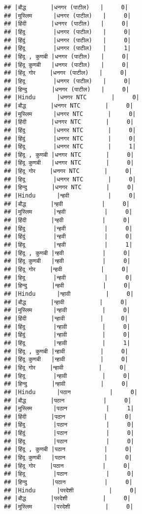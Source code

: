 \documentclass[
]{article}
\begin{document}
\begin{verbatim}
## |बौद्ध       |धनगर (पाटील)   |     0|
## |मुस्लिम      |धनगर (पाटील)   |     0|
## |हिंदी       |धनगर (पाटील)   |     0|
## |हिंदु        |धनगर (पाटील)   |     0|
## |हिंदुं        |धनगर (पाटील)   |     0|
## |हिंदू        |धनगर (पाटील)   |     1|
## |हिंदू , कुणबी |धनगर (पाटील)   |     0|
## |हिंदू कुणबी   |धनगर (पाटील)   |     0|
## |हिंदू गोर    |धनगर (पाटील)   |     0|
## |हिदू        |धनगर (पाटील)   |     0|
## |हिन्दु       |धनगर (पाटील)   |     0|
## |Hindu      |धनगर NTC       |     0|
## |बौद्ध       |धनगर NTC       |     0|
## |मुस्लिम      |धनगर NTC       |     0|
## |हिंदी       |धनगर NTC       |     0|
## |हिंदु        |धनगर NTC       |     0|
## |हिंदुं        |धनगर NTC       |     0|
## |हिंदू        |धनगर NTC       |     1|
## |हिंदू , कुणबी |धनगर NTC       |     0|
## |हिंदू कुणबी   |धनगर NTC       |     0|
## |हिंदू गोर    |धनगर NTC       |     0|
## |हिदू        |धनगर NTC       |     0|
## |हिन्दु       |धनगर NTC       |     0|
## |Hindu      |न्हवी           |     0|
## |बौद्ध       |न्हवी           |     0|
## |मुस्लिम      |न्हवी           |     0|
## |हिंदी       |न्हवी           |     0|
## |हिंदु        |न्हवी           |     0|
## |हिंदुं        |न्हवी           |     0|
## |हिंदू        |न्हवी           |     1|
## |हिंदू , कुणबी |न्हवी           |     0|
## |हिंदू कुणबी   |न्हवी           |     0|
## |हिंदू गोर    |न्हवी           |     0|
## |हिदू        |न्हवी           |     0|
## |हिन्दु       |न्हवी           |     0|
## |Hindu      |न्हावी          |     0|
## |बौद्ध       |न्हावी          |     0|
## |मुस्लिम      |न्हावी          |     0|
## |हिंदी       |न्हावी          |     0|
## |हिंदु        |न्हावी          |     0|
## |हिंदुं        |न्हावी          |     0|
## |हिंदू        |न्हावी          |     1|
## |हिंदू , कुणबी |न्हावी          |     0|
## |हिंदू कुणबी   |न्हावी          |     0|
## |हिंदू गोर    |न्हावी          |     0|
## |हिदू        |न्हावी          |     0|
## |हिन्दु       |न्हावी          |     0|
## |Hindu      |पठान           |     0|
## |बौद्ध       |पठान           |     0|
## |मुस्लिम      |पठान           |     1|
## |हिंदी       |पठान           |     0|
## |हिंदु        |पठान           |     0|
## |हिंदुं        |पठान           |     0|
## |हिंदू        |पठान           |     0|
## |हिंदू , कुणबी |पठान           |     0|
## |हिंदू कुणबी   |पठान           |     0|
## |हिंदू गोर    |पठान           |     0|
## |हिदू        |पठान           |     0|
## |हिन्दु       |पठान           |     0|
## |Hindu      |परदेशी          |     0|
## |बौद्ध       |परदेशी          |     0|
## |मुस्लिम      |परदेशी          |     0|

\end{verbatim}
\end{document}

